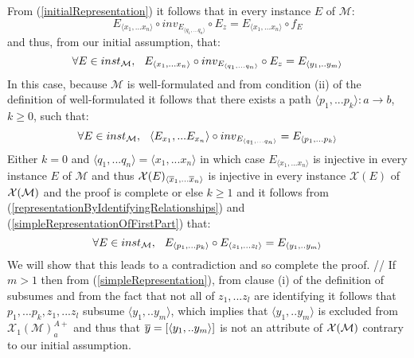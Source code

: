 \documentclass[10pt,a4paper]{article}
\newcommand{\genericmodel}{\mathcal{M}}
\newcommand{\logtophys}{\mathcal{X}}
\newcommand{\chiOne}[1]{{\mathcal{X}_1}(\genericmodel)^{A+}_{#1}}
\begin{document}
\noindent From (\ref{initialRepresentation}) it follows that in every instance $E$ of $\genericmodel$:  
\begin{equation*}
E_{\langle x_1,...x_n \rangle}\circ inv_{E_{\langle q_1,...q_n \rangle}} \circ E_{z}  = E_{\langle x_1,...x_n \rangle} \circ f_E 
\end{equation*}
\noindent and thus, from our initial assumption, that:
\begin{equation}
\label{representationByIdentifyingRelationships}
\ineveryinstance E_{\langle x_1,...x_n \rangle}\circ inv_{E_{\langle q_1,...q_n \rangle}} \circ E_{z} = E_{\langle y_1,..y_m \rangle} 
\end{equation}
\noindent In this case, because $\genericmodel$ is well-formulated and from condition (ii) of the definition of well-formulated it follows that there exists
a path $\langle p_1,...p_k \rangle:a \rightarrow b$, $k \geq 0$, such that:
\begin{equation}
\label{simpleRepresentationOfFirstPart}
\ineveryinstance \langle E_{x_1},...E_{x_n} \rangle \circ inv_{E_{\langle q_1,...q_n \rangle}} = E_{\langle p_1,...p_k \rangle}
\end{equation}
\noindent Either $k=0$ and $\langle q_1,...q_n \rangle = \langle x_1,...x_n \rangle$ in which case $E_{\langle x_1,...x_n \rangle}$ is
injective in every instance $E$ of $\genericmodel$ and thus $\logtophys(E)_{\langle \phys{x}_1,...\phys{x}_n \rangle}$ is
injective in every instance $\logtophys(E)$ of $\genericphysical$ and the proof is complete 
\noindent or else $k \geq 1$ and it follows from (\ref{representationByIdentifyingRelationships}) and (\ref{simpleRepresentationOfFirstPart}) that:
\begin{equation} 
\label{simpleRepresentation}
\ineveryinstance  E_{\langle p_1,...p_k \rangle} \circ E_{\langle z_1,...z_l \rangle} = E_{\langle y_1,..y_m \rangle} 
\end{equation}
\noindent We will show that this leads to a contradiction and so complete the proof. //
If $m >1$ then
 from  (\ref{simpleRepresentation}),
from clause (i) of the definition of subsumes and from the fact that not all of $z_1,...z_l$ are identifying 
it follows that $p_1,...p_k,z_1,...z_l$ subsume $\langle y_1,..y_m \rangle$, 
which implies that $\langle y_1,..y_m \rangle$ is excluded from $\chiOne{a}$ and thus that 
 $\overline{y}=\left[\langle y_1,..y_m \rangle\right]$ is not an attribute of $\genericphysical$ contrary to our 
initial assumption. 
\end{document}
